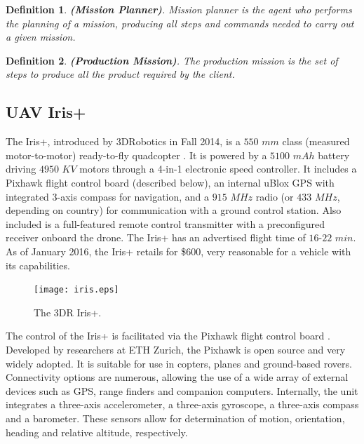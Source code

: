 \documentclass[12pt]{article}
\newtheorem{myDefinition}{Definition}
\begin{document}
\begin{myDefinition}
\textbf{(Mission Planner)}.
Mission planner is the agent who performs the planning of a mission, producing all steps and commands needed to carry out a given mission.
\label{def:planejadorMissao}
\end{myDefinition}

\begin{myDefinition}
 \textbf{(Production Mission)}.
The production mission is the set of steps to produce all the product required by the client.
\label{def:prodMission}
\end{myDefinition}



\subsection{UAV Iris+}
\label{subsec:uaviris}

The Iris+, introduced by 3DRobotics in Fall 2014, is a $550$ $mm$ class (measured motor-to-motor) ready-to-fly quadcopter \cite{iris+}. It is powered by a $5100$ $mAh$ battery driving $4950$ $KV$ motors through a 4-in-1 electronic speed controller. It includes a Pixhawk flight control board (described below), an internal uBlox GPS with integrated 3-axis compass for navigation, and a $915$ $MHz$ radio (or $433$ $MHz$, depending on country) for communication with a ground control station. Also included is a full-featured remote control transmitter with a preconfigured receiver onboard the drone. The Iris+ has an advertised flight time of $16$-$22$ $min$. As of January 2016, the Iris+ retails for \$600, very reasonable for a vehicle with its capabilities.

	\begin{figure}[H]
	\centering
	\texttt{[image: iris.eps]}
	\caption{The 3DR Iris+.\label{fig:iris}}
	\end{figure}

The control of the Iris+ is facilitated via the Pixhawk flight control board \cite{meier2011pixhawk}. Developed by researchers at ETH Zurich, the Pixhawk is open source and very widely adopted. It is suitable for use in copters, planes and ground-based rovers. Connectivity options are numerous, allowing the use of a wide array of external devices such as GPS, range finders and companion computers. Internally, the unit integrates a three-axis accelerometer, a three-axis gyroscope, a three-axis compass and a barometer. These sensors allow for determination of motion, orientation, heading and relative altitude, respectively.
\end{document}
